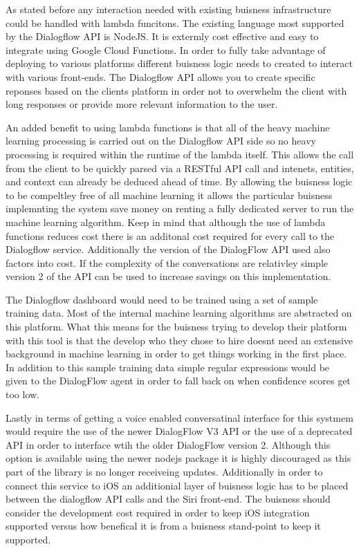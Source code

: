 \documentclass[9pt,software]{livecoms}
\begin{document}
As stated before any interaction needed with existing buisness infrastructure could be handled with lambda funcitons. The existing language most 
supported by the Dialogflow API is NodeJS. It is extermly cost effective and easy to integrate using Google Cloud Functions. In order to fully take
advantage of deploying to various platforms different buisness logic needs to created to interact with various front-ends. The Dialogflow API allows
you to create specific reponses based on the clients platform in order not to overwhelm the client with long responses or provide more relevant information
to the user.  

An added benefit to using lambda functions is that all of the heavy machine learning processing is carried out on the Dialogflow API side so no heavy
processing is required within the runtime of the lambda itself. This allows the call from the client to be quickly parsed via a RESTful API call and 
intenets, entities, and context can already be deduced ahead of time. By allowing the buisness logic to be compeltley free of all machine learning it allows
the particular buisness implemnting the system save money on renting a fully dedicated server to run the machine learning algorithm. Keep in mind that although
the use of lambda functions reduces cost there is an additonal cost required for every call to the Dialogflow service. Additionally the version of the DialogFlow API 
used also factors into cost. If the complexity of the conversations are relativley simple version 2 of the API can be used to increase savings on this implementation.

The Dialogflow dashboard would need to be trained using a set of sample training data. Most of the internal machine learning algorithms are abstracted on this platform. 
What this means for the buisness trying to develop their platform with this tool is that the develop who they chose to hire doesnt need an extensive background in machine
learning in order to get things working in the first place. In addition to this sample training data simple regular expressions would be given to the DialogFlow agent in order
to fall back on when confidence scores get too low. 

Lastly in terms of getting a voice enabled conversatinal interface for this systmem would require the use of the newer DialogFlow V3 API or the use of a deprecated 
API in order to interface wtih the older DialogFlow version 2. Although this option is available using the newer nodejs package it is highly discouraged as this part
of the library is no longer receiveing updates. Additionally in order to connect this service to iOS an additionial layer of buisness logic has to be placed between the 
dialogflow API calls and the Siri front-end. The buisness should consider the development cost required in order to keep iOS integration supported versus how 
benefical it is from a buisness stand-point to keep it supported. 
\end{document}
